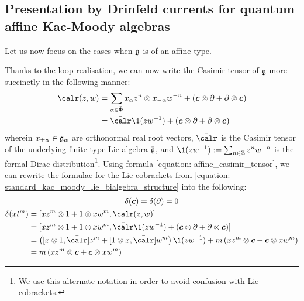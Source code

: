     \subsection{Presentation by Drinfeld currents for quantum affine Kac-Moody algebras}
        Let us now focus on the cases when $\mathfrak{g}$ is of an affine type.
        
        Thanks to the loop realisation, we can now write the Casimir tensor of $\mathfrak{g}$ more succinctly in the following manner:
            \begin{equation} \label{equation: affine_casimir_tensor}
                \begin{aligned}
                    \calr(z, w) & = \sum_{\alpha \in \bar{\rootsystem}} x_{\alpha} z^n \tensor x_{-\alpha} w^{-n} + ( \level \tensor \del + \del \tensor \level )
                    \\
                    & = \bar{\calr} \1(zw^{-1}) + ( \level \tensor \del + \del \tensor \level )
                \end{aligned}
            \end{equation}
        wherein $x_{\pm \alpha} \in \mathfrak{g}_{\alpha}$ are orthonormal real root vectors, $\bar{\calr}$ is the Casimir tensor of the underlying finite-type Lie algebra $\bar{\mathfrak{g}}$, and $\1(zw^{-1}) := \sum_{n \in \Z} z^n w^{-n}$ is the formal Dirac distribution\footnote{We use this alternate notation in order to avoid confusion with Lie cobrackets.}. Using formula \eqref{equation: affine_casimir_tensor}, we can rewrite the formulae for the Lie cobrackets from \eqref{equation: standard_kac_moody_lie_bialgebra_structure} into the following:
            \begin{equation}
                \begin{gathered}
                    \delta(\level) = \delta(\del) = 0
                    \\
                    \begin{aligned}
                        \delta( x t^m ) & = [x z^m \tensor 1 + 1 \tensor x w^m, \calr(z, w)]
                        \\
                        & = [ x z^m \tensor 1 + 1 \tensor x w^m, \bar{\calr} \1(zw^{-1}) + ( \level \tensor \del + \del \tensor \level ) ]
                        \\
                        & = \left( [x \tensor 1, \bar{\calr}] z^m + [1 \tensor x, \bar{\calr}] w^m \right) \1(zw^{-1}) + m \left( x z^m \tensor \level + \level \tensor x w^m \right)
                        \\
                        & = m \left( x z^m \tensor \level + \level \tensor x w^m \right)
                    \end{aligned}
                \end{gathered}  
            \end{equation}
